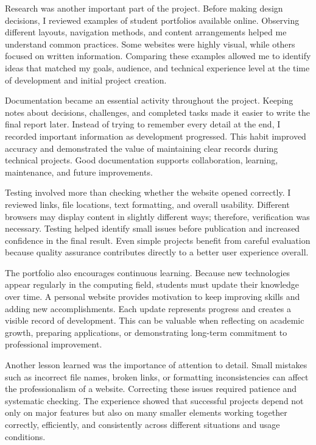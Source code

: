 \documentclass[12pt]{article}
\begin{document}
Research was another important part of the project. Before making design decisions, I reviewed examples of student portfolios available online. Observing different layouts, navigation methods, and content arrangements helped me understand common practices. Some websites were highly visual, while others focused on written information. Comparing these examples allowed me to identify ideas that matched my goals, audience, and technical experience level at the time of development and initial project creation.

Documentation became an essential activity throughout the project. Keeping notes about decisions, challenges, and completed tasks made it easier to write the final report later. Instead of trying to remember every detail at the end, I recorded important information as development progressed. This habit improved accuracy and demonstrated the value of maintaining clear records during technical projects. Good documentation supports collaboration, learning, maintenance, and future improvements.

Testing involved more than checking whether the website opened correctly. I reviewed links, file locations, text formatting, and overall usability. Different browsers may display content in slightly different ways; therefore, verification was necessary. Testing helped identify small issues before publication and increased confidence in the final result. Even simple projects benefit from careful evaluation because quality assurance contributes directly to a better user experience overall.

The portfolio also encourages continuous learning. Because new technologies appear regularly in the computing field, students must update their knowledge over time. A personal website provides motivation to keep improving skills and adding new accomplishments. Each update represents progress and creates a visible record of development. This can be valuable when reflecting on academic growth, preparing applications, or demonstrating long-term commitment to professional improvement.

Another lesson learned was the importance of attention to detail. Small mistakes such as incorrect file names, broken links, or formatting inconsistencies can affect the professionalism of a website. Correcting these issues required patience and systematic checking. The experience showed that successful projects depend not only on major features but also on many smaller elements working together correctly, efficiently, and consistently across different situations and usage conditions.
\end{document}
